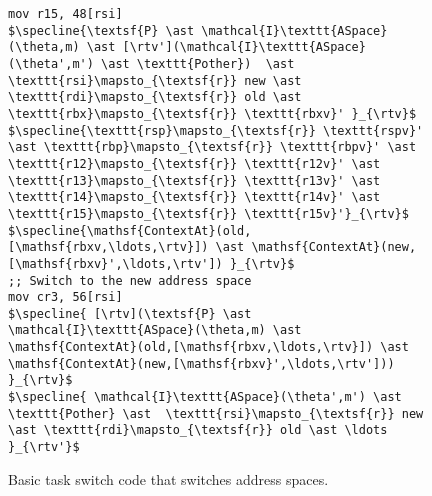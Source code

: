 \begin{figure}
\begin{lstlisting}[mathescape]
mov r15, 48[rsi]
$\specline{\textsf{P} \ast \mathcal{I}\texttt{ASpace}(\theta,m) \ast [\rtv'](\mathcal{I}\texttt{ASpace}(\theta',m') \ast \texttt{Pother})  \ast  \texttt{rsi}\mapsto_{\textsf{r}} new \ast \texttt{rdi}\mapsto_{\textsf{r}} old \ast \texttt{rbx}\mapsto_{\textsf{r}} \texttt{rbxv}' }_{\rtv}$
$\specline{\texttt{rsp}\mapsto_{\textsf{r}} \texttt{rspv}' \ast \texttt{rbp}\mapsto_{\textsf{r}} \texttt{rbpv}' \ast \texttt{r12}\mapsto_{\textsf{r}} \texttt{r12v}' \ast \texttt{r13}\mapsto_{\textsf{r}} \texttt{r13v}' \ast \texttt{r14}\mapsto_{\textsf{r}} \texttt{r14v}' \ast \texttt{r15}\mapsto_{\textsf{r}} \texttt{r15v}'}_{\rtv}$
$\specline{\mathsf{ContextAt}(old,[\mathsf{rbxv,\ldots,\rtv}]) \ast \mathsf{ContextAt}(new,[\mathsf{rbxv}',\ldots,\rtv']) }_{\rtv}$
;; Switch to the new address space
mov cr3, 56[rsi]
$\specline{ [\rtv](\textsf{P} \ast \mathcal{I}\texttt{ASpace}(\theta,m) \ast \mathsf{ContextAt}(old,[\mathsf{rbxv,\ldots,\rtv}]) \ast \mathsf{ContextAt}(new,[\mathsf{rbxv}',\ldots,\rtv']))  }_{\rtv}$
$\specline{ \mathcal{I}\texttt{ASpace}(\theta',m') \ast \texttt{Pother} \ast  \texttt{rsi}\mapsto_{\textsf{r}} new \ast \texttt{rdi}\mapsto_{\textsf{r}} old \ast \ldots }_{\rtv'}$
\end{lstlisting}
\vspace{-1em}
\caption{Basic task switch code that switches address spaces.}
\label{fig:swtch}
\end{figure}

